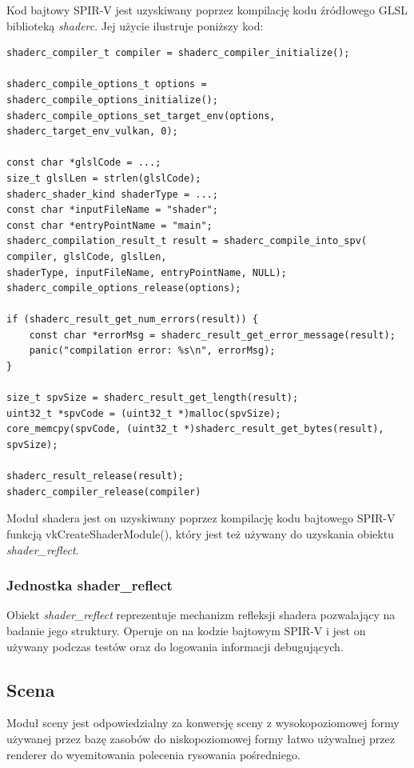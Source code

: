 Kod bajtowy SPIR-V jest uzyskiwany poprzez kompilację kodu źródłowego GLSL biblioteką \textit{shaderc}.
Jej użycie ilustruje poniższy kod:
\lstset{language=C}
\begin{lstlisting}[caption={Kompilacja kodu źródłowego GLSL biblioteką \textit{shaderc}},captionpos=b]
shaderc_compiler_t compiler = shaderc_compiler_initialize();

shaderc_compile_options_t options = shaderc_compile_options_initialize();
shaderc_compile_options_set_target_env(options, shaderc_target_env_vulkan, 0);

const char *glslCode = ...;
size_t glslLen = strlen(glslCode);
shaderc_shader_kind shaderType = ...;
const char *inputFileName = "shader";
const char *entryPointName = "main";
shaderc_compilation_result_t result = shaderc_compile_into_spv(
compiler, glslCode, glslLen,
shaderType, inputFileName, entryPointName, NULL);
shaderc_compile_options_release(options);

if (shaderc_result_get_num_errors(result)) {
	const char *errorMsg = shaderc_result_get_error_message(result);
	panic("compilation error: %s\n", errorMsg);
}

size_t spvSize = shaderc_result_get_length(result);
uint32_t *spvCode = (uint32_t *)malloc(spvSize);
core_memcpy(spvCode, (uint32_t *)shaderc_result_get_bytes(result), spvSize);

shaderc_result_release(result);
shaderc_compiler_release(compiler)
\end{lstlisting}

Moduł shadera jest on uzyskiwany poprzez kompilację kodu bajtowego SPIR-V funkcją vkCreateShaderModule(), który jest też używany do uzyskania obiektu \textit{shader\_reflect}.

\subsubsection{Jednostka shader\_reflect}
Obiekt \textit{shader\_reflect} reprezentuje mechanizm refleksji shadera pozwalający na badanie jego struktury.
Operuje on na kodzie bajtowym SPIR-V i jest on używany podczas testów oraz do logowania informacji debugujących.

\subsection{Scena}

Moduł sceny jest odpowiedzialny za konwersję sceny z wysokopoziomowej formy używanej przez bazę zasobów do niskopoziomowej formy łatwo używalnej przez renderer do wyemitowania polecenia rysowania pośredniego.

